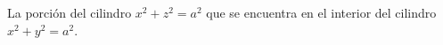 \item La porción del cilindro $x^2 + z^2 = a^2$ que se encuentra en el interior del cilindro $x^2 + y^2 = a^2$.
